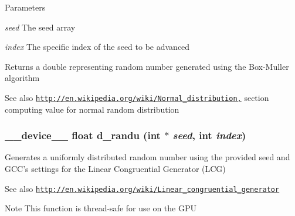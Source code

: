 \begin{DoxyParams}{Parameters}
\item[{\em seed}]The seed array \item[{\em index}]The specific index of the seed to be advanced \end{DoxyParams}
\begin{DoxyReturn}{Returns}
a double representing random number generated using the Box-\/Muller algorithm 
\end{DoxyReturn}
\begin{DoxySeeAlso}{See also}
\href{http://en.wikipedia.org/wiki/Normal_distribution,}{\tt http://en.wikipedia.org/wiki/Normal\_\-distribution,} section computing value for normal random distribution 
\end{DoxySeeAlso}
\hypertarget{ex__particle__CUDA__float_8cu_add17ca83d016a5c14fed14c87734ac8c}{
\subsubsection[{d\_\-randu}]{\setlength{\rightskip}{0pt plus 5cm}\_\-\_\-device\_\-\_\- float d\_\-randu (int $\ast$ {\em seed}, \/  int {\em index})}}
\label{ex__particle__CUDA__float_8cu_add17ca83d016a5c14fed14c87734ac8c}
Generates a uniformly distributed random number using the provided seed and GCC's settings for the Linear Congruential Generator (LCG) \begin{DoxySeeAlso}{See also}
\href{http://en.wikipedia.org/wiki/Linear_congruential_generator}{\tt http://en.wikipedia.org/wiki/Linear\_\-congruential\_\-generator} 
\end{DoxySeeAlso}
\begin{DoxyNote}{Note}
This function is thread-\/safe for use on the GPU 
\end{DoxyNote}

